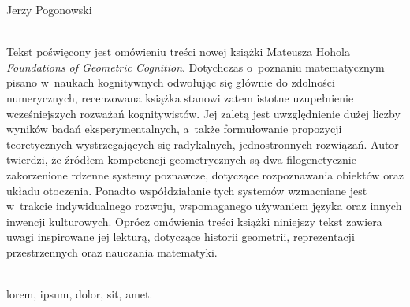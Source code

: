 \begin{newrevplenv}{Jerzy Pogonowski}




\vspace{5mm}%
\begin{flushright}
{\chaptitleeng\color{black!50}{Geometric cognition\\from a~cognitive point of view}}
\end{flushright}

{}\\
{Tekst poświęcony jest omówieniu treści nowej książki Mateusza
Hohola {\em Foundations of Geometric Cognition}. Dotychczas o~poznaniu matematycznym pisano w~naukach kognitywnych odwołując się
głównie do zdolności numerycznych, recenzowana książka stanowi
zatem istotne uzupełnienie wcześniejszych rozważań kognitywistów.
Jej zaletą jest uwzględnienie dużej liczby wyników badań
eksperymentalnych, a~także formułowanie propozycji teoretycznych
wystrzegających się radykalnych, jednostronnych rozwiązań. Autor
twierdzi, że źródłem kompetencji geometrycznych są dwa
filogenetycznie zakorzenione rdzenne systemy poznawcze, dotyczące
rozpoznawania obiektów oraz układu otoczenia. Ponadto
współdziałanie tych systemów wzmacniane jest w~trakcie
indywidualnego rozwoju, wspomaganego używaniem języka oraz innych
inwencji kulturowych. Oprócz omówienia treści książki niniejszy
tekst zawiera uwagi inspirowane jej lekturą, dotyczące historii
geometrii, reprezentacji przestrzennych oraz nauczania matematyki.}\par%
\vspace{2mm}%
{}\\%
{lorem, ipsum, dolor, sit, amet.}%





\end{newrevplenv}

